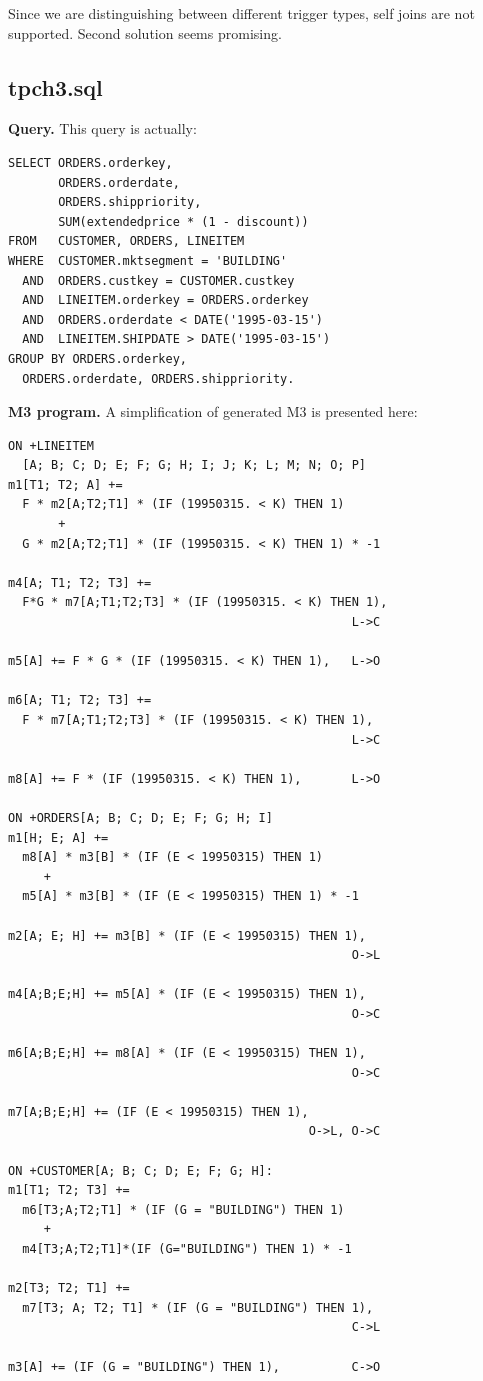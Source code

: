 \documentclass{sig-semester}
\begin{document}
Since we are distinguishing between different trigger types, self joins are not supported. Second solution seems promising.

\subsection{tpch3.sql}
\textbf{Query.} This query is actually:

\begin{verbatim}
SELECT ORDERS.orderkey, 
       ORDERS.orderdate,
       ORDERS.shippriority,
       SUM(extendedprice * (1 - discount))
FROM   CUSTOMER, ORDERS, LINEITEM
WHERE  CUSTOMER.mktsegment = 'BUILDING'
  AND  ORDERS.custkey = CUSTOMER.custkey
  AND  LINEITEM.orderkey = ORDERS.orderkey
  AND  ORDERS.orderdate < DATE('1995-03-15')
  AND  LINEITEM.SHIPDATE > DATE('1995-03-15')
GROUP BY ORDERS.orderkey, 
  ORDERS.orderdate, ORDERS.shippriority.
\end{verbatim}

\newpage
\textbf{M3 program.} A simplification of generated M3 is presented here:
\begin{verbatim}
ON +LINEITEM
  [A; B; C; D; E; F; G; H; I; J; K; L; M; N; O; P] 
m1[T1; T2; A] +=
  F * m2[A;T2;T1] * (IF (19950315. < K) THEN 1)
       + 
  G * m2[A;T2;T1] * (IF (19950315. < K) THEN 1) * -1

m4[A; T1; T2; T3] +=
  F*G * m7[A;T1;T2;T3] * (IF (19950315. < K) THEN 1),
                                                L->C
     
m5[A] += F * G * (IF (19950315. < K) THEN 1),   L->O
 
m6[A; T1; T2; T3] +=
  F * m7[A;T1;T2;T3] * (IF (19950315. < K) THEN 1),    
                                                L->C

m8[A] += F * (IF (19950315. < K) THEN 1),       L->O    

ON +ORDERS[A; B; C; D; E; F; G; H; I]
m1[H; E; A] +=
  m8[A] * m3[B] * (IF (E < 19950315) THEN 1)
     + 
  m5[A] * m3[B] * (IF (E < 19950315) THEN 1) * -1
   
m2[A; E; H] += m3[B] * (IF (E < 19950315) THEN 1),    
                                                O->L
 
m4[A;B;E;H] += m5[A] * (IF (E < 19950315) THEN 1),
                                                O->C
 
m6[A;B;E;H] += m8[A] * (IF (E < 19950315) THEN 1),
                                                O->C
 
m7[A;B;E;H] += (IF (E < 19950315) THEN 1),      
                                          O->L, O->C

ON +CUSTOMER[A; B; C; D; E; F; G; H]: 
m1[T1; T2; T3] +=
  m6[T3;A;T2;T1] * (IF (G = "BUILDING") THEN 1)
     + 
  m4[T3;A;T2;T1]*(IF (G="BUILDING") THEN 1) * -1
 
m2[T3; T2; T1] +=
  m7[T3; A; T2; T1] * (IF (G = "BUILDING") THEN 1),  
                                                C->L
 
m3[A] += (IF (G = "BUILDING") THEN 1),          C->O  
\end{verbatim}
\end{document}

